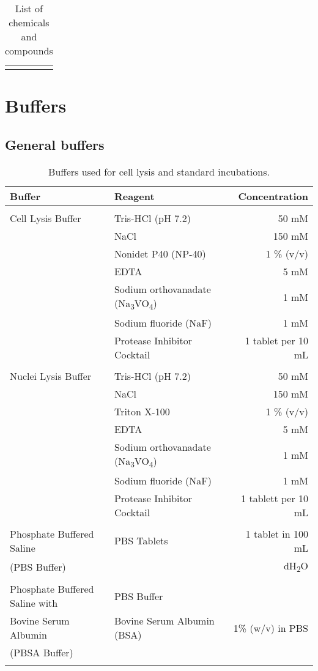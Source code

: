 \begin{center}
\begin{longtable}{l l}
\caption[Chemicals and compounds]{List of chemicals and compounds}\\

\label{Chemicals}
\end{longtable}

\end{center}



\section{Buffers}

\subsection{General buffers}

\begin{table}[H]
\begin{tabular}{l l r}
\textbf{Buffer} & \textbf{Reagent} & \textbf{Concentration}\\
\hline
\\
Cell Lysis Buffer & Tris-HCl (pH 7.2) & 50 mM\\ & NaCl & 150 mM \\ & Nonidet P40 (NP-40) & 1 \% (v/v) \\ & EDTA & 5 mM\\ & Sodium orthovanadate (Na\textsubscript{3}VO\textsubscript{4}) & 1 mM\\ & Sodium fluoride (NaF) & 1 mM\\ & Protease Inhibitor Cocktail & 1 tablet per 10 mL \\  
\\
Nuclei Lysis Buffer & Tris-HCl (pH 7.2) & 50 mM\\ & NaCl & 150 mM\\ & Triton X-100 & 1 \% (v/v)\\ & EDTA & 5 mM\\ & Sodium orthovanadate (Na\textsubscript{3}VO\textsubscript{4}) & 1 mM\\ & Sodium fluoride (NaF) & 1 mM\\ & Protease Inhibitor Cocktail & 1 tablett per 10 mL\\
\\ 
Phosphate Buffered Saline & PBS Tablets & 1 tablet in 100 mL \\ 
(PBS Buffer) & & dH\textsubscript{2}O\\
\\
Phosphate Buffered Saline with & PBS Buffer & \\
Bovine Serum Albumin & Bovine Serum Albumin (BSA) & 1\% (w/v) in PBS \\
(PBSA Buffer) & & \\
\\

\end{tabular}

\caption[General buffers]{Buffers used for cell lysis and standard incubations.}
\label{General buffers}
\end{table}

